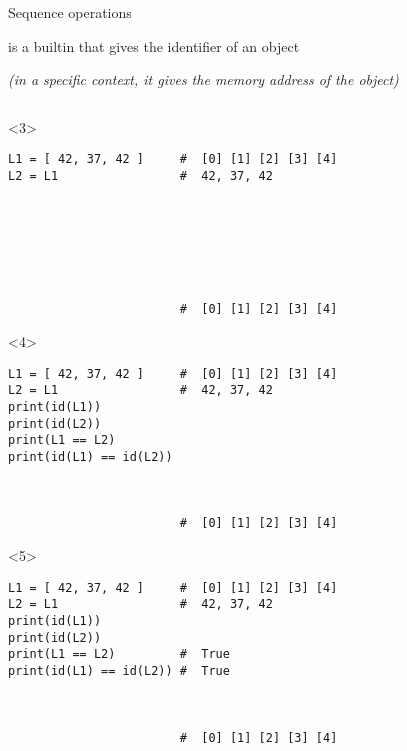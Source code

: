 \begin{frame}[fragile]{Sequence operations}

    is a builtin that gives the identifier of an object

   {\footnotesize \textit{(in a specific context, it gives the memory address of the object)} }

  \begin{center}

  \begin{columns}[onlytextwidth]
    \begin{column}{\textwidth}

      \begin{onlyenv}<3>
        \begin{lstlisting}[style=python,morekeywords={for, in, range, list}]
L1 = [ 42, 37, 42 ]     #  [0] [1] [2] [3] [4]
L2 = L1                 #  42, 37, 42







                        #  [0] [1] [2] [3] [4] \end{lstlisting}
      \end{onlyenv}

      \begin{onlyenv}<4>
        \begin{lstlisting}[style=python,morekeywords={for, in, range, list}]
L1 = [ 42, 37, 42 ]     #  [0] [1] [2] [3] [4]
L2 = L1                 #  42, 37, 42
print(id(L1))
print(id(L2))
print(L1 == L2)
print(id(L1) == id(L2))



                        #  [0] [1] [2] [3] [4] \end{lstlisting}
      \end{onlyenv}

      \begin{onlyenv}<5>
        \begin{lstlisting}[style=python,morekeywords={for, in, range, list}]
L1 = [ 42, 37, 42 ]     #  [0] [1] [2] [3] [4]
L2 = L1                 #  42, 37, 42
print(id(L1))
print(id(L2))
print(L1 == L2)         #  True
print(id(L1) == id(L2)) #  True



                        #  [0] [1] [2] [3] [4] \end{lstlisting}
      \end{onlyenv}


\end{column}
\end{columns}
\end{center}
\end{frame}
